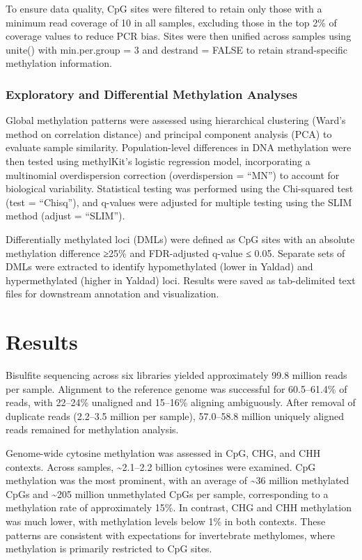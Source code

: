 \documentclass[
]{agujournal2019}
\begin{document}
To ensure data quality, CpG sites were filtered to retain only those
with a minimum read coverage of 10 in all samples, excluding those in
the top 2\% of coverage values to reduce PCR bias. Sites were then
unified across samples using unite() with min.per.group = 3 and destrand
= FALSE to retain strand-specific methylation information.

\subsubsection{Exploratory and Differential Methylation
Analyses}\label{exploratory-and-differential-methylation-analyses}

Global methylation patterns were assessed using hierarchical clustering
(Ward's method on correlation distance) and principal component analysis
(PCA) to evaluate sample similarity. Population-level differences in DNA
methylation were then tested using methylKit's logistic regression
model, incorporating a multinomial overdispersion correction
(overdispersion = ``MN'') to account for biological variability.
Statistical testing was performed using the Chi-squared test (test =
``Chisq''), and q-values were adjusted for multiple testing using the
SLIM method (adjust = ``SLIM'').

Differentially methylated loci (DMLs) were defined as CpG sites with an
absolute methylation difference ≥25\% and FDR-adjusted q-value ≤ 0.05.
Separate sets of DMLs were extracted to identify hypomethylated (lower
in Yaldad) and hypermethylated (higher in Yaldad) loci. Results were
saved as tab-delimited text files for downstream annotation and
visualization.

\section{Results}\label{results}

Bisulfite sequencing across six libraries yielded approximately 99.8
million reads per sample. Alignment to the reference genome was
successful for 60.5--61.4\% of reads, with 22--24\% unaligned and
15--16\% aligning ambiguously. After removal of duplicate reads
(2.2--3.5 million per sample), 57.0--58.8 million uniquely aligned reads
remained for methylation analysis.

Genome-wide cytosine methylation was assessed in CpG, CHG, and CHH
contexts. Across samples, \textasciitilde2.1--2.2 billion cytosines were
examined. CpG methylation was the most prominent, with an average of
\textasciitilde36 million methylated CpGs and \textasciitilde205 million
unmethylated CpGs per sample, corresponding to a methylation rate of
approximately 15\%. In contrast, CHG and CHH methylation was much lower,
with methylation levels below 1\% in both contexts. These patterns are
consistent with expectations for invertebrate methylomes, where
methylation is primarily restricted to CpG sites.
\end{document}
